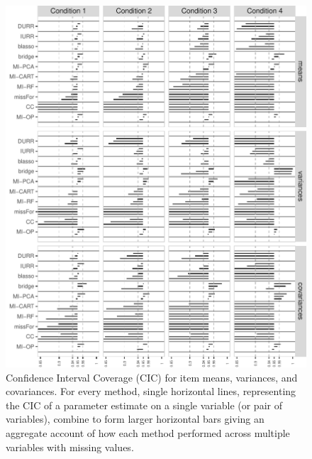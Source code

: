 \begin{figure}
\centering
\includegraphics{../../output/graphs/exp1_CI_summy.pdf}
\caption{\label{fig:exp1cir}
	Confidence Interval Coverage (CIC) for item means, variances, and covariances. 
	For every method, single horizontal lines, representing the CIC of a parameter estimate on 
	a single variable (or pair of variables), combine to form larger horizontal bars giving an 
	aggregate account of how each method performed across multiple variables with missing values.
	}
\end{figure}
	

